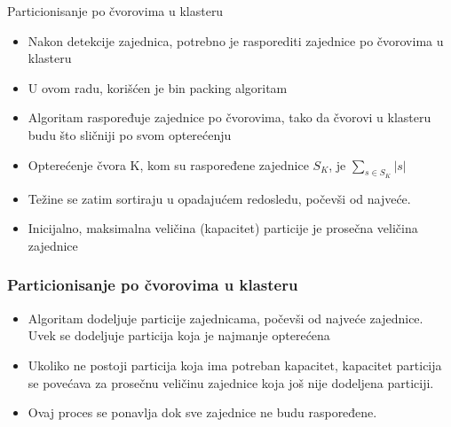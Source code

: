 \documentclass{beamer}
\begin{document}
\begin{frame}{Particionisanje po čvorovima u klasteru}
    \begin{itemize}
        \item Nakon detekcije zajednica, potrebno je rasporediti zajednice po čvorovima u klasteru
        \item U ovom radu, korišćen je bin packing algoritam
        \item Algoritam raspoređuje zajednice po čvorovima, tako da čvorovi u klasteru budu što sličniji po svom opterećenju
        \item Opterećenje čvora K, kom su raspoređene zajednice $ S_K $, je $ \sum_{s \in S_K} |s| $
        \item Težine se zatim sortiraju u opadajućem redosledu, počevši od najveće.
        \item Inicijalno, maksimalna veličina (kapacitet) particije je prosečna veličina zajednice 
    \end{itemize}
\end{frame}

\begin{frame}
    \frametitle{Particionisanje po čvorovima u klasteru}
    \begin{itemize}
        \item Algoritam dodeljuje particije zajednicama, počevši od najveće zajednice. Uvek se dodeljuje particija koja je najmanje opterećena
        \item Ukoliko ne postoji particija koja ima potreban kapacitet, kapacitet particija se povećava za prosečnu veličinu zajednice koja još nije dodeljena particiji. 
        \item Ovaj proces se ponavlja dok sve zajednice ne budu raspoređene.
    \end{itemize}
\end{frame}
\end{document}

